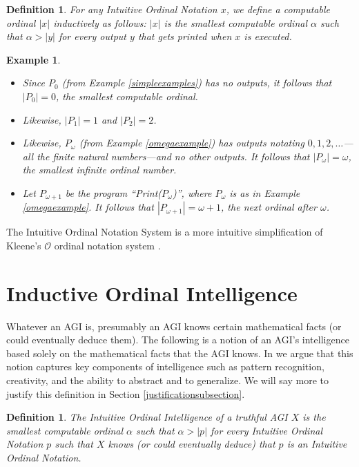 \documentclass[runningheads]{llncs}
\newtheorem{myexample}[mytheorem]{Example}
\newtheorem{mydefinition}[mytheorem]{Definition}
\begin{document}
\begin{mydefinition}
    For any Intuitive Ordinal Notation $x$, we define a computable ordinal $|x|$
    inductively as follows: $|x|$ is the smallest computable ordinal $\alpha$
    such that $\alpha>|y|$ for every output $y$ that gets printed when $x$ is
    executed.
\end{mydefinition}

\begin{myexample}
    \begin{itemize}
        \item
        Since $P_0$ (from Example \ref{simpleexamples}) has no outputs,
        it follows that $|P_0|=0$, the smallest computable ordinal.
        \item
        Likewise, $|P_1|=1$ and $|P_2|=2$.
        \item
        Likewise, $P_\omega$ (from Example \ref{omegaexample}) has outputs
        notating $0, 1, 2, \ldots$---all the finite natural numbers---and no
        other outputs. It follows that $|P_\omega|=\omega$, the smallest
        infinite ordinal number.
        \item
        Let $P_{\omega+1}$ be the program ``Print($P_\omega$)'',
        where $P_\omega$ is as in Example \ref{omegaexample}.
        It follows that $|P_{\omega+1}|=\omega+1$, the next ordinal after
        $\omega$.
    \end{itemize}
\end{myexample}

The Intuitive Ordinal Notation System is a more intuitive simplification of
Kleene's $\mathcal O$ ordinal notation system \cite{kleene1938notation}.

\section{Inductive Ordinal Intelligence}
\label{informalargumentsection}

Whatever an AGI is, presumably an AGI knows certain mathematical facts
(or could eventually deduce them).
The following is a notion of an AGI's intelligence based
solely on the mathematical facts that the AGI knows. In \cite{alexander2019measuring}
we argue that this notion captures key components of intelligence such as
pattern recognition, creativity, and the ability to abstract and to
generalize. We will say more to justify this definition in
Section \ref{justificationsubsection}.

\begin{mydefinition}
\label{maindefinition}
    The \emph{Intuitive Ordinal Intelligence} of a truthful AGI $X$ is the smallest computable
    ordinal $\alpha$ such that $\alpha>|p|$ for every Intuitive Ordinal Notation
    $p$ such that $X$ knows (or could eventually deduce) that $p$ is an
    Intuitive Ordinal Notation.
\end{mydefinition}
\end{document}
